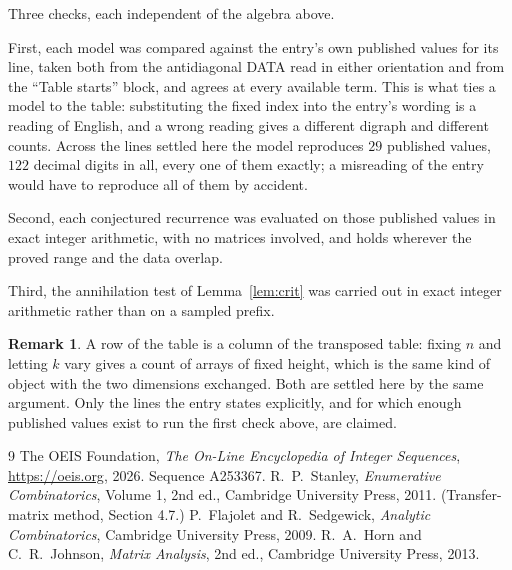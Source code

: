 \documentclass[11pt,a4paper]{article}
\theoremstyle{plain}
\theoremstyle{definition}
\newtheorem{remark}[theorem]{Remark}
\begin{document}
Three checks, each independent of the algebra above.

First, each model was compared against the entry's own published values for its line, taken
both from the antidiagonal DATA read in either orientation and from the ``Table starts''
block, and agrees at every available term. This is what ties a model to the table:
substituting the fixed index into the entry's wording is a reading of English, and a wrong
reading gives a different digraph and different counts. Across the lines settled here the
model reproduces $29$ published values, $122$ decimal digits in all, every one of
them exactly; a misreading of the entry would have to reproduce all of them by accident.

Second, each conjectured recurrence was evaluated on those published values in exact
integer arithmetic, with no matrices involved, and holds wherever the proved range and the
data overlap.

Third, the annihilation test of Lemma~\ref{lem:crit} was carried out in exact integer
arithmetic rather than on a sampled prefix.

\begin{remark}
A row of the table is a column of the transposed table: fixing $n$ and letting $k$ vary gives a
count of arrays of fixed height, which is the same kind of object with the two dimensions
exchanged. Both are settled here by the same argument. Only the lines the entry states
explicitly, and for which enough published values exist to run the first check above, are
claimed.
\end{remark}

\begin{thebibliography}{9}
 The OEIS Foundation, \emph{The On-Line Encyclopedia of Integer
Sequences}, \url{https://oeis.org}, 2026. Sequence A253367.
 R.~P.~Stanley, \emph{Enumerative Combinatorics}, Volume 1, 2nd ed.,
Cambridge University Press, 2011. (Transfer-matrix method, Section 4.7.)
 P.~Flajolet and R.~Sedgewick, \emph{Analytic Combinatorics}, Cambridge
University Press, 2009.
 R.~A.~Horn and C.~R.~Johnson, \emph{Matrix Analysis}, 2nd ed., Cambridge
University Press, 2013.
\end{thebibliography}
\end{document}
